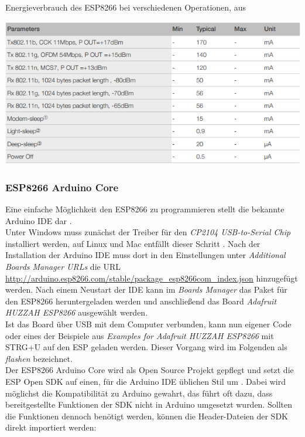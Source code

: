 \begin{table}[h]
  \centering
  \caption{Energieverbrauch des ESP8266 bei verschiedenen Operationen, aus \cite{espressif2017esp8266}}
	\includegraphics[width=\textwidth]{images/esppower.png}

  \label{table:esppower}
\end{table}


\subsubsection{ESP8266 Arduino Core}
Eine einfache Möglichkeit den ESP8266 zu programmieren stellt die bekannte Arduino IDE dar \cite{banzi2017arduino}.\\
Unter Windows muss zunächst der Treiber für den \textit{CP2104 USB-to-Serial Chip} installiert werden, auf Linux und Mac entfällt dieser Schritt \cite{fried2017feather}.
Nach der Installation der Arduino IDE muss dort in den Einstellungen unter \textit{Additional Boards Manager URLs} die URL \url{http://arduino.esp8266.com/stable/package_esp8266com_index.json} hinzugefügt werden.  
Nach einem Neustart der IDE kann im \textit{Boards Manager} das Paket für den ESP8266 heruntergeladen werden und anschließend das Board \textit{Adafruit HUZZAH ESP8266} ausgewählt werden. \\
Ist das Board über USB mit dem Computer verbunden, kann nun eigener Code oder eines der Beispiele aus \textit{Examples for Adafruit HUZZAH ESP8266} mit STRG+U auf den ESP geladen werden. 
Dieser Vorgang wird im Folgenden als \emph{flashen} bezeichnet. \\
Der ESP8266 Arduino Core wird als Open Source Projekt gepflegt und setzt die ESP Open SDK auf einen, für die Arduino IDE üblichen Stil um \cite{arduino2017core}. 
Dabei wird möglichst die Kompatibilität zu Arduino gewahrt, das führt oft dazu, dass bereitgestellte Funktionen der SDK nicht in Arduino umgesetzt wurden.
Sollten die Funktionen dennoch benötigt werden, können die Header-Dateien der SDK direkt importiert werden:

